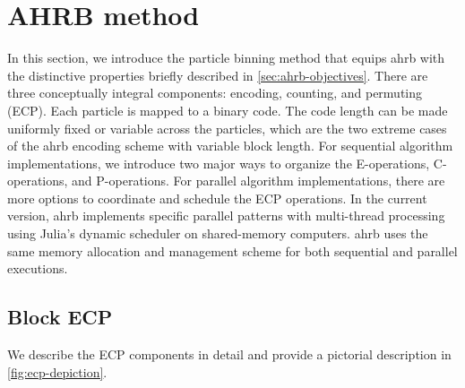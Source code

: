 \documentclass[final]{juliacon}
\begin{document}
 

\section{AHRB method} 
\label{sec:method} 


%
%
%
%
%
%
%


In this section, we introduce the particle binning method that equips
{\sc ahrb} with the distinctive properties briefly described in
\cref{sec:ahrb-objectives}. There are three conceptually integral
components: encoding, counting, and permuting (ECP). Each particle is
mapped to a binary code. The code length can be made uniformly fixed
or variable across the particles, which are the two extreme cases of
the {\sc ahrb} encoding scheme with variable block length. For
sequential algorithm implementations, we introduce two major ways to
organize the E-operations, C-operations, and P-operations. 
%
For parallel algorithm implementations, there are more options to
coordinate and schedule the ECP operations. In the current version,
{\sc ahrb} implements specific parallel patterns with multi-thread
processing using Julia's dynamic scheduler on shared-memory computers.
{\sc ahrb} uses the same memory allocation and management scheme for
both sequential and parallel executions. 
%


\subsection{Block ECP}
\label{sec:ECP-description}

\vspace{3pt} We describe the ECP components in detail and provide a
pictorial description in \cref{fig:ecp-depiction}.

\vspace{2pt}
\end{document}
